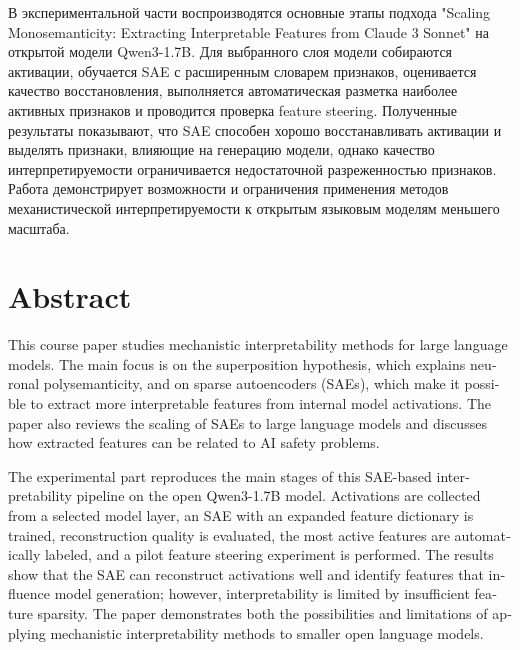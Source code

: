 \documentclass[a4paper,14pt]{extreport}
\begin{document}
В экспериментальной части воспроизводятся основные этапы подхода "Scaling Monosemanticity: Extracting Interpretable Features from Claude 3 Sonnet" на открытой модели Qwen3-1.7B. Для выбранного слоя модели собираются активации, обучается SAE с расширенным словарем признаков, оценивается качество восстановления, выполняется автоматическая разметка наиболее активных признаков и проводится проверка feature steering. Полученные результаты показывают, что SAE способен хорошо восстанавливать активации и выделять признаки, влияющие на генерацию модели, однако качество интерпретируемости ограничивается недостаточной разреженностью признаков. Работа демонстрирует возможности и ограничения применения методов механистической интерпретируемости к открытым языковым моделям меньшего масштаба.


\vspace{15mm}

\section*{Abstract}
\begin{otherlanguage}{english}
\sloppy
This course paper studies mechanistic interpretability methods for large language models. The main focus is on the superposition hypothesis, which explains neuronal polysemanticity, and on sparse autoencoders (SAEs), which make it possible to extract more interpretable features from internal model activations. The paper also reviews the scaling of SAEs to large language models and discusses how extracted features can be related to AI safety problems.

The experimental part reproduces the main stages of this SAE-based interpretability pipeline on the open Qwen3-1.7B model. Activations are collected from a selected model layer, an SAE with an expanded feature dictionary is trained, reconstruction quality is evaluated, the most active features are automatically labeled, and a pilot feature steering experiment is performed. The results show that the SAE can reconstruct activations well and identify features that influence model generation; however, interpretability is limited by insufficient feature sparsity. The paper demonstrates both the possibilities and limitations of applying mechanistic interpretability methods to smaller open language models.
\end{otherlanguage}


\newpage

\pagestyle{plain}
\tableofcontents
\newpage
\end{document}
